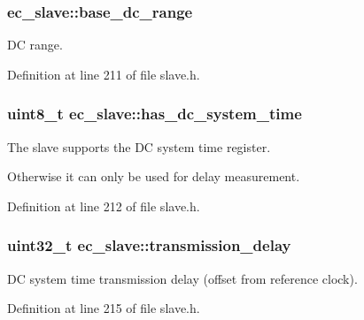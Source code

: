 \subsubsection[{base\-\_\-dc\-\_\-range}]{ ec\-\_\-slave\-::base\-\_\-dc\-\_\-range}\label{structec__slave_a8bc5c82a2467c31b4c427fe4c56cb544}


D\-C range. 



Definition at line 211 of file slave.\-h.

\subsubsection[{has\-\_\-dc\-\_\-system\-\_\-time}]{\setlength{\rightskip}{0pt plus 5cm}uint8\-\_\-t ec\-\_\-slave\-::has\-\_\-dc\-\_\-system\-\_\-time}\label{structec__slave_a65fba9aad1f196c6c43ba7dceecc15dd}


The slave supports the D\-C system time register. 

Otherwise it can only be used for delay measurement. 

Definition at line 212 of file slave.\-h.

\subsubsection[{transmission\-\_\-delay}]{\setlength{\rightskip}{0pt plus 5cm}uint32\-\_\-t ec\-\_\-slave\-::transmission\-\_\-delay}\label{structec__slave_a0e5d719413436f927eba7320ee565125}


D\-C system time transmission delay (offset from reference clock). 



Definition at line 215 of file slave.\-h.

